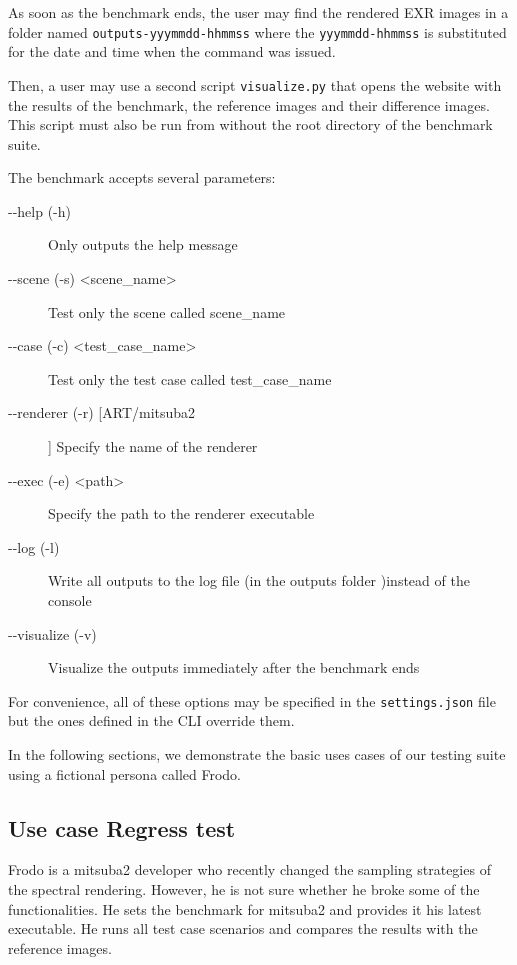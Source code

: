 As soon as the benchmark ends, the user may find the rendered EXR images in a folder named \texttt{outputs-yyymmdd-hhmmss} where the \texttt{yyymmdd-hhmmss} is substituted for the date and time when the command was issued.

Then, a user may use a second script \texttt{visualize.py} that opens the website with the results of the benchmark, the reference images and their difference images. This script must also be run from without the root directory of the benchmark suite.

The benchmark accepts several parameters:
\begin{description}
	\item[-{}-help (-h)] Only outputs the help message
	\item[-{}-scene (-s) \textless scene\_name\textgreater] Test only the scene called scene\_name
	\item[-{}-case (-c) \textless test\_case\_name\textgreater] Test only the test case called test\_case\_name
	\item[-{}-renderer (-r) [ART/mitsuba2]] Specify the name of the renderer 
	\item[-{}-exec (-e) \textless path\textgreater] Specify the path to the renderer executable
	\item[-{}-log (-l)] Write all outputs to the log file (in the outputs folder )instead of the console
	\item[-{}-visualize (-v)] Visualize the outputs immediately after the benchmark ends
\end{description}

For convenience, all of these options may be specified in the \texttt{settings.json} file but the ones defined in the CLI override them.

In the following sections, we demonstrate the basic uses cases of our testing suite using a fictional persona called Frodo.

\subsection{Use case Regress test}

Frodo is a mitsuba2 developer who recently changed the sampling strategies of the spectral rendering. However, he is not sure whether he broke some of the functionalities. He sets the benchmark for mitsuba2 and provides it his latest executable. He runs all test case scenarios and compares the results with the reference images.
 
